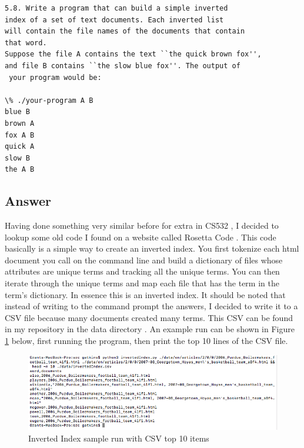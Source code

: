 \documentclass[letterpaper,11pt]{article}
\newcommand*{\srcPath}{../src}%
\begin{document}
\begin{verbatim}
5.8. Write a program that can build a simple inverted 
index of a set of text documents. Each inverted list
will contain the file names of the documents that contain
that word.
Suppose the file A contains the text ``the quick brown fox'', 
and file B contains ``the slow blue fox''. The output of
 your program would be:

\% ./your-program A B
blue B
brown A
fox A B
quick A
slow B
the A B
\end{verbatim}

\subsection*{Answer}

Having done something very similar before for extra in CS532 \cite{cs532}, I decided to lookup some old code I found on a website called Rosetta Code \cite{invertedindexref}.
This code basically is a simple way to create an inverted index.
You first tokenize each html document you call on the command line and build a dictionary of files whose attributes are unique terms and tracking all the unique terms.
You can then iterate through the unique terms and map each file that has the term in the term's dictionary. 
In essence this is an inverted index.
It should be noted that instead of writing to the command prompt the answers, I decided to write it to a CSV file because many documents created many terms.
This CSV can be found in my repository in the data directory \cite{github}.
An example run can be shown in Figure \ref{fig:invertIndex} below, first running the program, then print the top 10 lines of the CSV file.

\begin{figure}[h]
\centering
\includegraphics[scale=0.6]{invertedIndexOutput.png}
\caption{Inverted Index sample run with CSV top 10 items}
\label{fig:invertIndex}
\end{figure}


\end{document}
